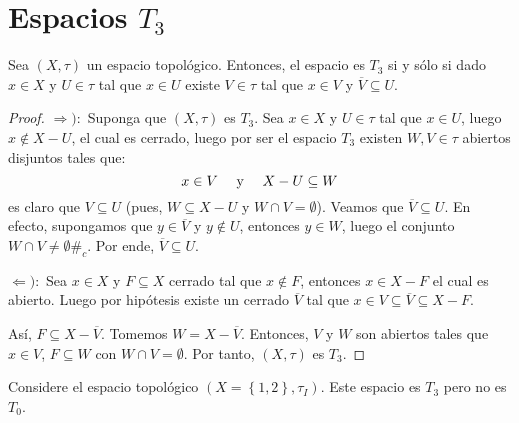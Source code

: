 \documentclass[12pt]{report}
\theoremstyle{largebreak}
\newcommand\contradiction{\ensuremath{\#_c}}
\newcommand{\Cls}[1]{\ensuremath{\overline{#1}}}
\begin{document}
    \section{Espacios $T_3$}

    \begin{propo}
        Sea $(X,\tau)$ un espacio topológico. Entonces, el espacio es $T_3$ si y sólo si dado $x\in X$ y $U\in\tau$ tal que $x\in U$ existe $V\in\tau$ tal que $x\in V$ y $\Cls{V}\subseteq U$.
    \end{propo}

    \begin{proof}
        $\Rightarrow):$ Suponga que $(X,\tau)$ es $T_3$. Sea $x\in X$ y $U\in\tau$ tal que $x\in U$, luego $x\notin X-U$, el cual es cerrado, luego por ser el espacio $T_3$ existen $W,V\in\tau$ abiertos disjuntos tales que:
        \begin{equation*}
            x\in V\quad\textup{ y }\quad X-U\subseteq W
        \end{equation*}
        es claro que $V\subseteq U$ (pues, $W\subseteq X-U$ y $W\cap V=\emptyset$). Veamos que $\Cls{V}\subseteq U$. En efecto, supongamos que $y\in\Cls{V}$ y $y\notin U$, entonces $y\in W$, luego el conjunto $W\cap V\neq\emptyset$\contradiction. Por ende, $\Cls{V}\subseteq U$.

        $\Leftarrow):$ Sea $x\in X$ y $F\subseteq X$ cerrado tal que $x\notin F$, entonces $x\in X-F$ el cual es abierto. Luego por hipótesis existe un cerrado $\Cls{V}$ tal que $x\in V\subseteq\Cls{V}\subseteq X-F$.

        Así, $F\subseteq X-\Cls{V}$. Tomemos $W=X-\Cls{V}$. Entonces, $V$ y $W$ son abiertos tales que $x\in V$, $F\subseteq W$ con $W\cap V=\emptyset$. Por tanto, $(X,\tau)$ es $T_3$.
    \end{proof}

    \begin{exa}
        Considere el espacio topológico $(X=\left\{1,2 \right\},\tau_I)$. Este espacio es $T_3$ pero no es $T_0$.
    \end{exa}
\end{document}
